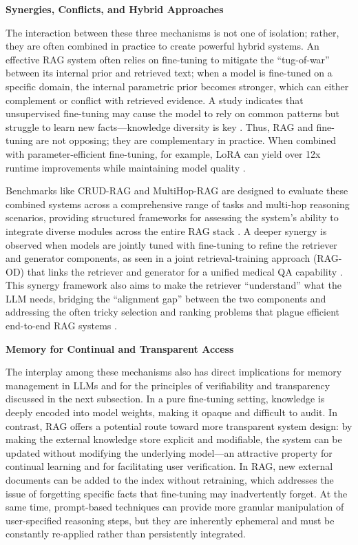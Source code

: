 \documentclass[11pt]{article}
\begin{document}
\textbf{Synergies, Conflicts, and Hybrid Approaches}

The interaction between these three mechanisms is not one of isolation; rather, they are often combined in practice to create powerful hybrid systems. An effective RAG system often relies on fine-tuning to mitigate the ``tug-of-war'' between its internal prior and retrieved text; when a model is fine-tuned on a specific domain, the internal parametric prior becomes stronger, which can either complement or conflict with retrieved evidence. A study indicates that unsupervised fine-tuning may cause the model to rely on common patterns but struggle to learn new facts---knowledge diversity is key \cite{ref30}. Thus, RAG and fine-tuning are not opposing; they are complementary in practice. When combined with parameter-efficient fine-tuning, for example, LoRA can yield over 12x runtime improvements while maintaining model quality \cite{ref425}.

Benchmarks like CRUD-RAG and MultiHop-RAG are designed to evaluate these combined systems across a comprehensive range of tasks and multi-hop reasoning scenarios, providing structured frameworks for assessing the system's ability to integrate diverse modules across the entire RAG stack \cite{ref399,ref49}. A deeper synergy is observed when models are jointly tuned with fine-tuning to refine the retriever and generator components, as seen in a joint retrieval-training approach (RAG-OD) that links the retriever and generator for a unified medical QA capability \cite{ref426}. This synergy framework also aims to make the retriever ``understand'' what the LLM needs, bridging the ``alignment gap'' between the two components and addressing the often tricky selection and ranking problems that plague efficient end-to-end RAG systems \cite{ref39}.

\textbf{Memory for Continual and Transparent Access}

The interplay among these mechanisms also has direct implications for memory management in LLMs and for the principles of verifiability and transparency discussed in the next subsection. In a pure fine-tuning setting, knowledge is deeply encoded into model weights, making it opaque and difficult to audit. In contrast, RAG offers a potential route toward more transparent system design: by making the external knowledge store explicit and modifiable, the system can be updated without modifying the underlying model---an attractive property for continual learning and for facilitating user verification. In RAG, new external documents can be added to the index without retraining, which addresses the issue of forgetting specific facts that fine-tuning may inadvertently forget. At the same time, prompt-based techniques can provide more granular manipulation of user-specified reasoning steps, but they are inherently ephemeral and must be constantly re-applied rather than persistently integrated.
\end{document}
